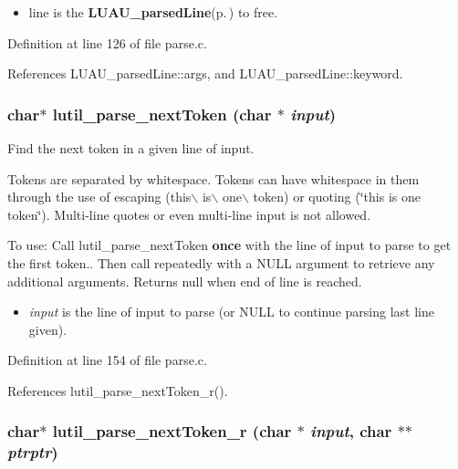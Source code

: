 \begin{itemize}
\item line is the {\bf LUAU\_\-parsed\-Line}{\rm (p.\,\pageref{structLUAU__parsedLine})} to free. \end{itemize}


Definition at line 126 of file parse.c.

References LUAU\_\-parsed\-Line::args, and LUAU\_\-parsed\-Line::keyword.
\subsubsection{\setlength{\rightskip}{0pt plus 5cm}char$\ast$ lutil\_\-parse\_\-next\-Token (char $\ast$ {\em input})}\label{parse_8c_a4}


Find the next token in a given line of input. 

Tokens are separated by whitespace. Tokens can have whitespace in them through the use of escaping (this$\backslash$ is$\backslash$ one$\backslash$ token) or quoting (\char`\"{}this is one token\char`\"{}). Multi-line quotes or even multi-line input is not allowed.

To use: Call lutil\_\-parse\_\-next\-Token {\bf once} with the line of input to parse to get the first token.. Then call repeatedly with a NULL argument to retrieve any additional arguments. Returns null when end of line is reached.

\begin{itemize}
\item {\em input\/} is the line of input to parse (or NULL to continue parsing last line given). 
\end{itemize}


Definition at line 154 of file parse.c.

References lutil\_\-parse\_\-next\-Token\_\-r().
\subsubsection{\setlength{\rightskip}{0pt plus 5cm}char$\ast$ lutil\_\-parse\_\-next\-Token\_\-r (char $\ast$ {\em input}, char $\ast$$\ast$ {\em ptrptr})}\label{parse_8c_a5}




